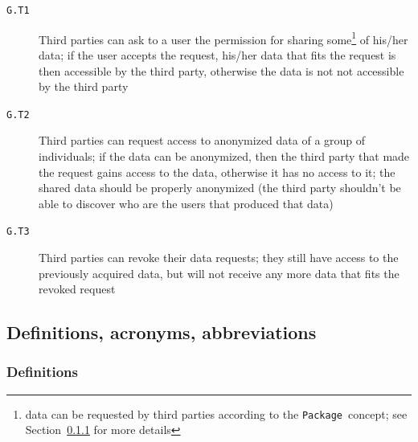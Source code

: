 \documentclass[12pt]{article}
\def \PACKAGE {\texttt{Package}}
\begin{document}
\begin{description}
          \item[\texttt{G.T1}] Third parties can ask to a user the permission for sharing some\footnote{data can be requested by third parties according to the \PACKAGE\ concept; see Section~\ref{sec:definitions} for more details %
          } of his/her data; if the user accepts the request, his/her data that fits the request
          is then accessible by the third party, otherwise the data is not not accessible by the third party
          \item[\texttt{G.T2}] Third parties can request access
          to anonymized data of a group of individuals; if the data can be anonymized, then the third party that made the request gains access to the data, otherwise it has no access to it; the shared data should be properly anonymized (the third party shouldn't be able to discover who are the users that produced that data)
          \item[\texttt{G.T3}] Third parties can revoke their data requests; they still have access
          to the previously acquired data, but will not receive any more data that fits the revoked request
        \end{description}

  \subsection{Definitions, acronyms, abbreviations}

    \subsubsection{Definitions}
    \label{sec:definitions}
\end{document}
